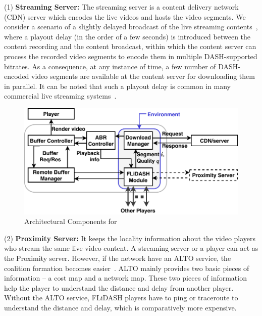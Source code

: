 \noindent (1) {\bf Streaming Server:} The streaming server is a content delivery  network (CDN) server which encodes the live videos and hosts the video segments. We consider a scenario of a slightly delayed broadcast of the live streaming contents~\cite{huysegems2015http}, where a playout delay (in the order of a few seconds) is introduced between the content recording and the content broadcast, within which the content server can process the recorded video segments to encode them in multiple DASH-supported bitrates. As a consequence, at any instance of time, a few number of DASH-encoded video segments are available at the content server for downloading them in parallel. It can be noted that such a playout delay is common in many commercial live streaming systems~\cite{zinner2017comparison}. 
\begin{figure}[!ht]
	\centering
	\includegraphics[width=0.8\linewidth]{img/PlayerDiagram}
	\caption{\label{fig:chap06:playerdiagram} Architectural Components for \our}
\end{figure}

\noindent (2) {\bf Proximity Server:} It keeps the locality information about the video players who stream the same live video content. A streaming server or a player can act as the Proximity server. However, if the network have an ALTO service, the coalition formation becomes easier~\cite{alimi2014application}. ALTO mainly provides two basic pieces of information -- a cost map and a network map. These two pieces of information help the player to understand the distance and delay from another player. Without the ALTO service, FLiDASH players have to ping or traceroute to understand the distance and delay, which is comparatively more expensive.


